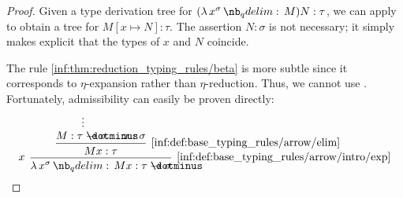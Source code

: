 \begin{proof}
  Given a type derivation tree for \( (\qabs {x^\sigma} M) N: \tau \), we can apply  to obtain a tree for \( M[x \mapsto N]: \tau \). The assertion \( N: \sigma \) is not necessary; it simply makes explicit that the types of \( x \) and \( N \) coincide.

  The rule \ref{inf:thm:reduction_typing_rules/beta} is more subtle since it corresponds to \( \eta \)-expansion rather than \( \eta \)-reduction. Thus, we cannot use . Fortunately, admissibility can easily be proven directly:
  \begin{equation*}
    \begin{prooftree}
      \hypo{}
      \ellipsis {} { M: \tau \synimplies \sigma }
      \hypo{ x: \sigma }

      \infer2[\ref{inf:def:base_typing_rules/arrow/elim}]{ Mx: \tau }

      \infer[left label=\( x \)]1[\ref{inf:def:base_typing_rules/arrow/intro/exp}]{ \qabs {x^\sigma} Mx: \tau \synimplies \sigma }
    \end{prooftree}
  \end{equation*}
\end{proof}


